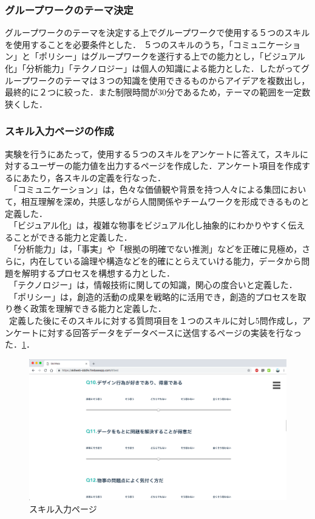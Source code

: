 \documentclass{funthesis}
\begin{document}
\subsubsection{グループワークのテーマ決定}
グループワークのテーマを決定する上でグループワークで使用する５つのスキルを使用することを必要条件とした．
５つのスキルのうち，「コミュニケーション」と「ポリシー」はグループワークを遂行する上での能力とし，「ビジュアル化」「分析能力」「テクノロジー」は個人の知識による能力とした．したがってグループワークのテーマは３つの知識を使用できるものからアイデアを複数出し，最終的に２つに絞った．また制限時間が30分であるため，テーマの範囲を一定数狭くした．

\subsubsection{スキル入力ページの作成}
実験を行うにあたって，使用する５つのスキルをアンケートに答えて，スキルに対するユーザーの能力値を出力するページを作成した．アンケート項目を作成するにあたり，各スキルの定義を行なった．\\
\ 「コミュニケーション」は，色々な価値観や背景を持つ人々による集団において，相互理解を深め，共感しながら人間関係やチームワークを形成できるものと定義した．\\
\ 「ビジュアル化」は，複雑な物事をビジュアル化し抽象的にわかりやすく伝えることができる能力と定義した．\\
\ 「分析能力」は，「事実」や「根拠の明確でない推測」などを正確に見極め，さらに，内在している論理や構造などを的確にとらえていける能力，データから問題を解明するプロセスを構想する力とした．\\
\ 「テクノロジー」は，情報技術に関しての知識，関心の度合いと定義した．\\
\ 「ポリシー」は，創造的活動の成果を戦略的に活用でき，創造的プロセスを取り巻く政策を理解できる能力と定義した．\\
\ 定義した後にそのスキルに対する質問項目を１つのスキルに対し5問作成し，アンケートに対する回答データをデータベースに送信するページの実装を行なった．\ref{testtest}．

\begin{figure}[h]
 \centering
   \includegraphics[width=150mm]{figures/test.png}
 \caption{スキル入力ページ}
 \label{testtest}
\end{figure}
\end{document}
